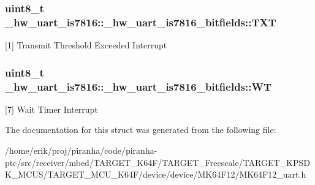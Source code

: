 \subsubsection[{\texorpdfstring{T\+XT}{TXT}}]{\setlength{\rightskip}{0pt plus 5cm}uint8\+\_\+t \+\_\+hw\+\_\+uart\+\_\+is7816\+::\+\_\+hw\+\_\+uart\+\_\+is7816\+\_\+bitfields\+::\+T\+XT}\hypertarget{struct__hw__uart__is7816_1_1__hw__uart__is7816__bitfields_a8c3c60cf71e1325bc2e723bf844721ea}{}\label{struct__hw__uart__is7816_1_1__hw__uart__is7816__bitfields_a8c3c60cf71e1325bc2e723bf844721ea}
\mbox{[}1\mbox{]} Transmit Threshold Exceeded Interrupt 
\subsubsection[{\texorpdfstring{WT}{WT}}]{\setlength{\rightskip}{0pt plus 5cm}uint8\+\_\+t \+\_\+hw\+\_\+uart\+\_\+is7816\+::\+\_\+hw\+\_\+uart\+\_\+is7816\+\_\+bitfields\+::\+WT}\hypertarget{struct__hw__uart__is7816_1_1__hw__uart__is7816__bitfields_af550c6fe4047e6ea0e6aaff637fe2154}{}\label{struct__hw__uart__is7816_1_1__hw__uart__is7816__bitfields_af550c6fe4047e6ea0e6aaff637fe2154}
\mbox{[}7\mbox{]} Wait Timer Interrupt 

The documentation for this struct was generated from the following file\+:\begin{DoxyCompactItemize}
\item 
/home/erik/proj/piranha/code/piranha-\/ptc/src/receiver/mbed/\+T\+A\+R\+G\+E\+T\+\_\+\+K64\+F/\+T\+A\+R\+G\+E\+T\+\_\+\+Freescale/\+T\+A\+R\+G\+E\+T\+\_\+\+K\+P\+S\+D\+K\+\_\+\+M\+C\+U\+S/\+T\+A\+R\+G\+E\+T\+\_\+\+M\+C\+U\+\_\+\+K64\+F/device/device/\+M\+K64\+F12/M\+K64\+F12\+\_\+uart.\+h\end{DoxyCompactItemize}
